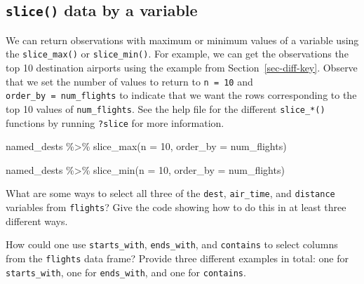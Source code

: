 \documentclass[
  letterpaper,
  DIV=11,
  numbers=noendperiod]{scrreprt}
\newenvironment{Shaded}{\begin{snugshade}}{\end{snugshade}}
\newcommand{\AttributeTok}[1]{\textcolor[rgb]{0.40,0.45,0.13}{#1}}
\newcommand{\DecValTok}[1]{\textcolor[rgb]{0.68,0.00,0.00}{#1}}
\newcommand{\FunctionTok}[1]{\textcolor[rgb]{0.28,0.35,0.67}{#1}}
\newcommand{\NormalTok}[1]{\textcolor[rgb]{0.00,0.23,0.31}{#1}}
\newcommand{\SpecialCharTok}[1]{\textcolor[rgb]{0.37,0.37,0.37}{#1}}
\theoremstyle{definition}
\theoremstyle{remark}
\begin{document}
\hypertarget{slice-data-by-a-variable}{%
\subsection{\texorpdfstring{\texttt{slice()} data by a
variable}{slice() data by a variable}}\label{slice-data-by-a-variable}}

We can return observations with maximum or minimum values of a variable
using the \texttt{slice\_max()} or \texttt{slice\_min()}. For example,
we can get the observations the top 10 destination airports using the
example from Section~\ref{sec-diff-key}. Observe that we set the number
of values to return to \texttt{n\ =\ 10} and
\texttt{order\_by\ =\ num\_flights} to indicate that we want the rows
corresponding to the top 10 values of \texttt{num\_flights}. See the
help file for the different \texttt{slice\_*()} functions by running
\texttt{?slice} for more information.

\begin{Shaded}
\begin{Highlighting}[]
\NormalTok{named\_dests }\SpecialCharTok{\%\textgreater{}\%} 
  \FunctionTok{slice\_max}\NormalTok{(}\AttributeTok{n =} \DecValTok{10}\NormalTok{, }\AttributeTok{order\_by =}\NormalTok{  num\_flights)}

\NormalTok{named\_dests }\SpecialCharTok{\%\textgreater{}\%} 
  \FunctionTok{slice\_min}\NormalTok{(}\AttributeTok{n =} \DecValTok{10}\NormalTok{, }\AttributeTok{order\_by =}\NormalTok{  num\_flights)}
\end{Highlighting}
\end{Shaded}

\begin{tcolorbox}[enhanced jigsaw, colback=white, toprule=.15mm, bottomrule=.15mm, titlerule=0mm, title={{🎯} Learning Check 3.16}, leftrule=.75mm, arc=.35mm, left=2mm, colframe=quarto-callout-tip-color-frame, coltitle=black, opacitybacktitle=0.6, bottomtitle=1mm, colbacktitle=quarto-callout-tip-color!10!white, opacityback=0, toptitle=1mm, rightrule=.15mm, breakable]

What are some ways to select all three of the \texttt{dest},
\texttt{air\_time}, and \texttt{distance} variables from
\texttt{flights}? Give the code showing how to do this in at least three
different ways.

\end{tcolorbox}

\begin{tcolorbox}[enhanced jigsaw, colback=white, toprule=.15mm, bottomrule=.15mm, titlerule=0mm, title={{🎯} Learning Check 3.17}, leftrule=.75mm, arc=.35mm, left=2mm, colframe=quarto-callout-tip-color-frame, coltitle=black, opacitybacktitle=0.6, bottomtitle=1mm, colbacktitle=quarto-callout-tip-color!10!white, opacityback=0, toptitle=1mm, rightrule=.15mm, breakable]

How could one use \texttt{starts\_with}, \texttt{ends\_with}, and
\texttt{contains} to select columns from the \texttt{flights} data
frame? Provide three different examples in total: one for
\texttt{starts\_with}, one for \texttt{ends\_with}, and one for
\texttt{contains}.

\end{tcolorbox}
\end{document}
